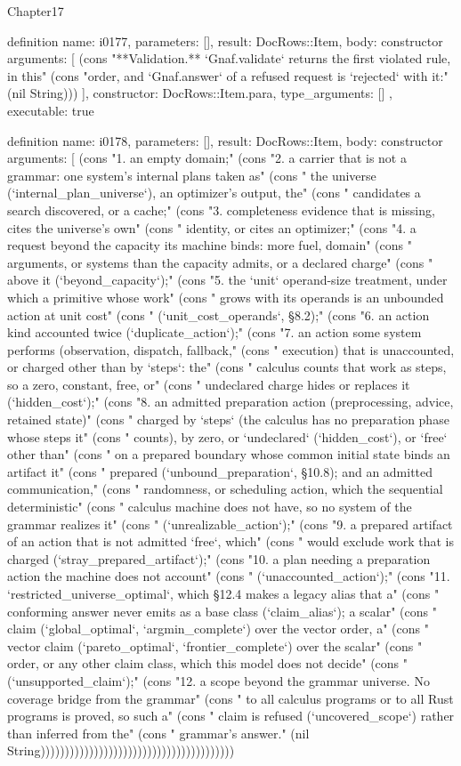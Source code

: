 \begin{lexlean}{Chapter17}
\begin{semanticmodule}
definition{
  name: i0177,
  parameters: [],
  result: DocRows::Item,
  body: constructor{
    arguments: [
      (cons "**Validation.** `Gnaf.validate` returns the first violated rule, in this" (cons "order, and `Gnaf.answer` of a refused request is `rejected` with it:" (nil String)))
    ],
    constructor: DocRows::Item.para,
    type_arguments: []
  },
  executable: true
}

definition{
  name: i0178,
  parameters: [],
  result: DocRows::Item,
  body: constructor{
    arguments: [
      (cons "1. an empty domain;" (cons "2. a carrier that is not a grammar: one system's internal plans taken as" (cons "   the universe (`internal_plan_universe`), an optimizer's output, the" (cons "   candidates a search discovered, or a cache;" (cons "3. completeness evidence that is missing, cites the universe's own" (cons "   identity, or cites an optimizer;" (cons "4. a request beyond the capacity its machine binds: more fuel, domain" (cons "   arguments, or systems than the capacity admits, or a declared charge" (cons "   above it (`beyond_capacity`);" (cons "5. the `unit` operand-size treatment, under which a primitive whose work" (cons "   grows with its operands is an unbounded action at unit cost" (cons "   (`unit_cost_operands`, §8.2);" (cons "6. an action kind accounted twice (`duplicate_action`);" (cons "7. an action some system performs (observation, dispatch, fallback," (cons "   execution) that is unaccounted, or charged other than by `steps`: the" (cons "   calculus counts that work as steps, so a zero, constant, free, or" (cons "   undeclared charge hides or replaces it (`hidden_cost`);" (cons "8. an admitted preparation action (preprocessing, advice, retained state)" (cons "   charged by `steps` (the calculus has no preparation phase whose steps it" (cons "   counts), by zero, or `undeclared` (`hidden_cost`), or `free` other than" (cons "   on a prepared boundary whose common initial state binds an artifact it" (cons "   prepared (`unbound_preparation`, §10.8); and an admitted communication," (cons "   randomness, or scheduling action, which the sequential deterministic" (cons "   calculus machine does not have, so no system of the grammar realizes it" (cons "   (`unrealizable_action`);" (cons "9. a prepared artifact of an action that is not admitted `free`, which" (cons "   would exclude work that is charged (`stray_prepared_artifact`);" (cons "10. a plan needing a preparation action the machine does not account" (cons "    (`unaccounted_action`);" (cons "11. `restricted_universe_optimal`, which §12.4 makes a legacy alias that a" (cons "    conforming answer never emits as a base class (`claim_alias`); a scalar" (cons "    claim (`global_optimal`, `argmin_complete`) over the vector order, a" (cons "    vector claim (`pareto_optimal`, `frontier_complete`) over the scalar" (cons "    order, or any other claim class, which this model does not decide" (cons "    (`unsupported_claim`);" (cons "12. a scope beyond the grammar universe. No coverage bridge from the grammar" (cons "    to all calculus programs or to all Rust programs is proved, so such a" (cons "    claim is refused (`uncovered_scope`) rather than inferred from the" (cons "    grammar's answer." (nil String))))))))))))))))))))))))))))))))))))))))
}}
\end{semanticmodule}
\end{lexlean}

